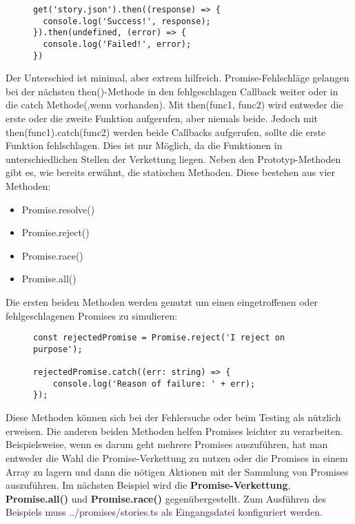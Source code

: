 \begin{figure}[H]
\begin{lstlisting}[basicstyle=\small]
get('story.json').then((response) => {
  console.log('Success!', response);
}).then(undefined, (error) => {
  console.log('Failed!', error);
})
\end{lstlisting}
\end{figure}

\noindent
Der Unterschied ist minimal, aber extrem hilfreich. Promise-Fehlschläge gelangen bei der nächsten then()-Methode in den fehlgeschlagen Callback weiter oder in die catch Methode(,wenn vorhanden). Mit then(func1, func2) wird entweder die erste oder die zweite Funktion aufgerufen, aber niemals beide. Jedoch mit then(func1).catch(func2) werden beide Callbacks aufgerufen, sollte die erste Funktion fehlschlagen. Dies ist nur Möglich, da die Funktionen in unterschiedlichen Stellen der Verkettung liegen. Neben den Prototyp-Methoden gibt es, wie bereits erwähnt, die statischen Methoden. Diese bestehen aus vier Methoden:

\begin{itemize}
\item Promise.resolve()
\item Promise.reject()
\item Promise.race()
\item Promise.all()
\end{itemize}

\noindent
Die ersten beiden Methoden werden genutzt um einen eingetroffenen oder fehlgeschlagenen Promises zu simulieren:

\begin{figure}[H]
\begin{lstlisting}[basicstyle=\small]
const rejectedPromise = Promise.reject('I reject on purpose');

rejectedPromise.catch((err: string) => {
    console.log('Reason of failure: ' + err);
});
\end{lstlisting}
\end{figure}

\noindent
Diese Methoden können sich bei der Fehlersuche oder beim Testing als nützlich erweisen. Die anderen beiden Methoden helfen Promises leichter zu verarbeiten. Beispielsweise, wenn es darum geht mehrere Promises auszuführen, hat man entweder die Wahl die Promise-Verkettung zu nutzen oder die Promises in einem Array zu lagern und dann die nötigen Aktionen mit der Sammlung von Promises auszuführen. Im nächsten Beispiel wird die \textbf{Promise-Verkettung}, \textbf{Promise.all()} und \textbf{Promise.race()} gegenübergestellt. Zum Ausführen des Beispiels muss ../promises/stories.ts als Eingangsdatei konfiguriert werden.


